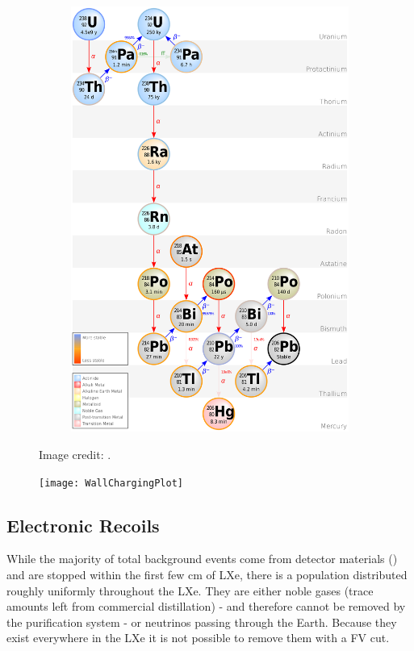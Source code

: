{\begin{figure}
\begin{subfigure}[t]{0.5\textwidth}
        \centering
        \includegraphics[width=\textwidth]{Decay_Chain_of_Uranium-238}
    \end{subfigure}
    \caption{Image credit: %
    .}
	\label{fig:backgrounds_decay_chains}
\end{figure}

\begin{figure}
\centering
\texttt{[image: WallChargingPlot]}
\label{fig:backgrounds_wall_charge}
\end{figure}


\subsection{Electronic Recoils}
\label{subsec:backgrounds_electronic}
While the majority of total background events come from detector materials () and are stopped
within the first few cm of LXe, there is a population distributed roughly uniformly throughout the LXe.  They are either noble gases (trace
amounts left from commercial distillation) - and therefore cannot be removed by the purification system - or neutrinos passing through the
Earth.  Because they exist everywhere in the LXe it is not possible to remove them with a FV cut.

}
